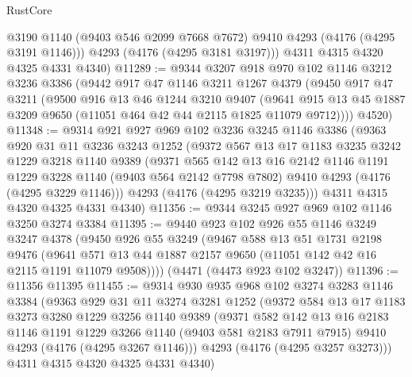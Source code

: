 \begin{lexlean}{RustCore}
\begin{coremodule}
          @3190
          @1140
          (@9403 @546 @2099 @7668 @7672)
          @9410
          @4293
          (@4176 (@4295 @3191 @1146)))
        @4293
        (@4176 (@4295 @3181 @3197)))
      @4311
      @4315
      @4320
      @4325
      @4331
      @4340)
@11289 := @9344
    @3207
    @918
    @970
    @102
    @1146
    @3212
    @3236
    @3386
    (@9442
      @917
      @47
      @1146
      @3211
      @1267
      @4379
      (@9450
        @917
        @47
        @3211
        (@9500
          @916
          @13
          @46
          @1244
          @3210
          @9407
          (@9641 @915 @13 @45 @1887 @3209 @9650 (@11051 @464 @42 @44 @2115 @1825 @11079 @9712))))
      @4520)
@11348 := @9314
    @921
    @927
    @969
    @102
    @3236
    @3245
    @1146
    @3386
    (@9363
      @920
      @31
      @11
      @3236
      @3243
      @1252
      (@9372
        @567
        @13
        @17
        @1183
        @3235
        @3242
        @1229
        @3218
        @1140
        @9389
        (@9371
          @565
          @142
          @13
          @16
          @2142
          @1146
          @1191
          @1229
          @3228
          @1140
          (@9403 @564 @2142 @7798 @7802)
          @9410
          @4293
          (@4176 (@4295 @3229 @1146)))
        @4293
        (@4176 (@4295 @3219 @3235)))
      @4311
      @4315
      @4320
      @4325
      @4331
      @4340)
@11356 := @9344 @3245 @927 @969 @102 @1146 @3250 @3274 @3384
@11395 := @9440
    @923
    @102
    @926
    @55
    @1146
    @3249
    @3247
    @4378
    (@9450
      @926
      @55
      @3249
      (@9467
        @588
        @13
        @51
        @1731
        @2198
        @9476
        (@9641 @571 @13 @44 @1887 @2157 @9650 (@11051 @142 @42 @16 @2115 @1191 @11079 @9508))))
    (@4471 (@4473 @923 @102 @3247))
@11396 := @11356 @11395
@11455 := @9314
    @930
    @935
    @968
    @102
    @3274
    @3283
    @1146
    @3384
    (@9363
      @929
      @31
      @11
      @3274
      @3281
      @1252
      (@9372
        @584
        @13
        @17
        @1183
        @3273
        @3280
        @1229
        @3256
        @1140
        @9389
        (@9371
          @582
          @142
          @13
          @16
          @2183
          @1146
          @1191
          @1229
          @3266
          @1140
          (@9403 @581 @2183 @7911 @7915)
          @9410
          @4293
          (@4176 (@4295 @3267 @1146)))
        @4293
        (@4176 (@4295 @3257 @3273)))
      @4311
      @4315
      @4320
      @4325
      @4331
      @4340)

\end{coremodule}
\end{lexlean}
